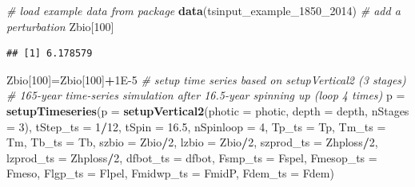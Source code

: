 \documentclass[
]{article}
\newenvironment{Shaded}{\begin{snugshade}}{\end{snugshade}}
\newcommand{\AttributeTok}[1]{\textcolor[rgb]{0.13,0.29,0.53}{#1}}
\newcommand{\CommentTok}[1]{\textcolor[rgb]{0.56,0.35,0.01}{\textit{#1}}}
\newcommand{\DecValTok}[1]{\textcolor[rgb]{0.00,0.00,0.81}{#1}}
\newcommand{\FloatTok}[1]{\textcolor[rgb]{0.00,0.00,0.81}{#1}}
\newcommand{\FunctionTok}[1]{\textcolor[rgb]{0.13,0.29,0.53}{\textbf{#1}}}
\newcommand{\NormalTok}[1]{#1}
\newcommand{\OtherTok}[1]{\textcolor[rgb]{0.56,0.35,0.01}{#1}}
\newcommand{\SpecialCharTok}[1]{\textcolor[rgb]{0.81,0.36,0.00}{\textbf{#1}}}
\begin{document}
\begin{Shaded}
\begin{Highlighting}[]
\CommentTok{\# load example data from package }
\FunctionTok{data}\NormalTok{(tsinput\_example\_1850\_2014)}
\CommentTok{\# add a perturbation}
\NormalTok{Zbio[}\DecValTok{100}\NormalTok{]}
\end{Highlighting}
\end{Shaded}

\begin{verbatim}
## [1] 6.178579
\end{verbatim}

\begin{Shaded}
\begin{Highlighting}[]
\NormalTok{Zbio[}\DecValTok{100}\NormalTok{]}\OtherTok{=}\NormalTok{Zbio[}\DecValTok{100}\NormalTok{]}\SpecialCharTok{+}\FloatTok{1E{-}5}
\CommentTok{\# setup time series based on setupVertical2 (3 stages)}
\CommentTok{\# 165{-}year time{-}series simulation after 16.5{-}year spinning up (loop 4 times)}
\NormalTok{p }\OtherTok{=} \FunctionTok{setupTimeseries}\NormalTok{(}\AttributeTok{p =} \FunctionTok{setupVertical2}\NormalTok{(}\AttributeTok{photic =}\NormalTok{ photic, }\AttributeTok{depth =}\NormalTok{ depth, }\AttributeTok{nStages =} \DecValTok{3}\NormalTok{),}
                  \AttributeTok{tStep\_ts =} \DecValTok{1}\SpecialCharTok{/}\DecValTok{12}\NormalTok{,}
                  \AttributeTok{tSpin =} \FloatTok{16.5}\NormalTok{, }
                  \AttributeTok{nSpinloop =} \DecValTok{4}\NormalTok{,}
                  \AttributeTok{Tp\_ts =}\NormalTok{ Tp,}
                  \AttributeTok{Tm\_ts =}\NormalTok{ Tm,}
                  \AttributeTok{Tb\_ts =}\NormalTok{ Tb,}
                  \AttributeTok{szbio =}\NormalTok{ Zbio}\SpecialCharTok{/}\DecValTok{2}\NormalTok{,}
                  \AttributeTok{lzbio =}\NormalTok{ Zbio}\SpecialCharTok{/}\DecValTok{2}\NormalTok{,}
                  \AttributeTok{szprod\_ts =}\NormalTok{ Zhploss}\SpecialCharTok{/}\DecValTok{2}\NormalTok{,}
                  \AttributeTok{lzprod\_ts =}\NormalTok{ Zhploss}\SpecialCharTok{/}\DecValTok{2}\NormalTok{,}
                  \AttributeTok{dfbot\_ts  =}\NormalTok{ dfbot,}
                  \AttributeTok{Fsmp\_ts   =}\NormalTok{ Fspel,}
                  \AttributeTok{Fmesop\_ts =}\NormalTok{ Fmeso,}
                  \AttributeTok{Flgp\_ts   =}\NormalTok{ Flpel,}
                  \AttributeTok{Fmidwp\_ts =}\NormalTok{ FmidP,}
                  \AttributeTok{Fdem\_ts   =}\NormalTok{ Fdem)}
\end{Highlighting}
\end{Shaded}
\end{document}

